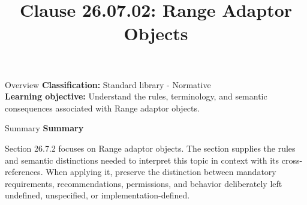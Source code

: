 \documentclass[10pt,letterpaper]{article}
\title{Clause 26.07.02: Range Adaptor Objects}
\author{}
\date{}
\begin{document}
\maketitle
\begin{CornellOverviewBox}{Overview}
\textbf{Classification:} Standard library - Normative\\[2pt]
\textbf{Learning objective:} Understand the rules, terminology, and semantic consequences associated with Range adaptor objects.
\end{CornellOverviewBox}\begin{CornellSummaryBox}{Summary}
{\sffamily\bfseries\color{Accent} Summary}\par\vspace{3pt}Section 26.7.2 focuses on Range adaptor objects. The section supplies the rules and semantic distinctions needed to interpret this topic in context with its cross-references. When applying it, preserve the distinction between mandatory requirements, recommendations, permissions, and behavior deliberately left undefined, unspecified, or implementation-defined.
\end{CornellSummaryBox}
\end{document}

